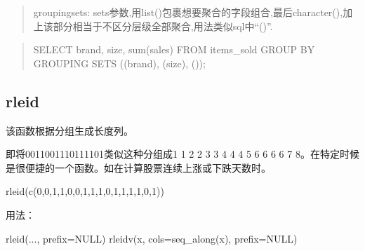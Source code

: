 \documentclass[
]{book}
\newenvironment{Shaded}{\begin{snugshade}}{\end{snugshade}}
\newcommand{\AttributeTok}[1]{\textcolor[rgb]{0.77,0.63,0.00}{#1}}
\newcommand{\ConstantTok}[1]{\textcolor[rgb]{0.00,0.00,0.00}{#1}}
\newcommand{\DecValTok}[1]{\textcolor[rgb]{0.00,0.00,0.81}{#1}}
\newcommand{\FunctionTok}[1]{\textcolor[rgb]{0.00,0.00,0.00}{#1}}
\newcommand{\NormalTok}[1]{#1}
\begin{document}
\begin{quote}
groupingsets: sets参数,用list()包裹想要聚合的字段组合,最后character(),加上该部分相当于不区分层级全部聚合,用法类似sql中``()''.
\end{quote}

\begin{quote}
SELECT brand, size, sum(sales) FROM items\_sold GROUP BY GROUPING SETS ((brand), (size), ());
\end{quote}

\hypertarget{rleid}{%
\subsection{rleid}\label{rleid}}

该函数根据分组生成长度列。

即将0011001110111101类似这种分组成1 1 2 2 3 3 4 4 4 5 6 6 6 6 7 8。在特定时候是很便捷的一个函数。如在计算股票连续上涨或下跌天数时。

\begin{Shaded}
\begin{Highlighting}[]
\FunctionTok{rleid}\NormalTok{(}\FunctionTok{c}\NormalTok{(}\DecValTok{0}\NormalTok{,}\DecValTok{0}\NormalTok{,}\DecValTok{1}\NormalTok{,}\DecValTok{1}\NormalTok{,}\DecValTok{0}\NormalTok{,}\DecValTok{0}\NormalTok{,}\DecValTok{1}\NormalTok{,}\DecValTok{1}\NormalTok{,}\DecValTok{1}\NormalTok{,}\DecValTok{0}\NormalTok{,}\DecValTok{1}\NormalTok{,}\DecValTok{1}\NormalTok{,}\DecValTok{1}\NormalTok{,}\DecValTok{1}\NormalTok{,}\DecValTok{0}\NormalTok{,}\DecValTok{1}\NormalTok{))}
\end{Highlighting}
\end{Shaded}

用法：

\begin{Shaded}
\begin{Highlighting}[]
\FunctionTok{rleid}\NormalTok{(..., }\AttributeTok{prefix=}\ConstantTok{NULL}\NormalTok{)}
\FunctionTok{rleidv}\NormalTok{(x, }\AttributeTok{cols=}\FunctionTok{seq\_along}\NormalTok{(x), }\AttributeTok{prefix=}\ConstantTok{NULL}\NormalTok{)}
\end{Highlighting}
\end{Shaded}
\end{document}
